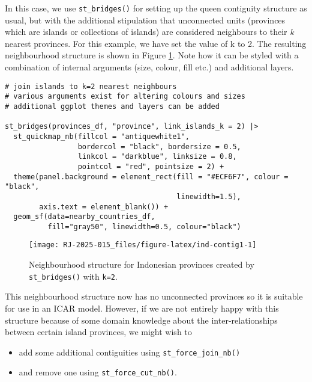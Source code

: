 In this case, we use \texttt{st\_bridges()} for setting up the queen contiguity
structure as usual, but with the additional stipulation that unconnected
units (provinces which are islands or collections of islands) are
considered neighbours to their \emph{k} nearest provinces. For this example,
we have set the value of k to 2. The resulting neighbourhood structure
is shown in Figure \ref{fig:ind-contig1}. Note how it can be styled with a combination of internal arguments (size, colour, fill etc.) and additional  layers.



\begin{verbatim}
# join islands to k=2 nearest neighbours
# various arguments exist for altering colours and sizes
# additional ggplot themes and layers can be added

st_bridges(provinces_df, "province", link_islands_k = 2) |>
  st_quickmap_nb(fillcol = "antiquewhite1",
                 bordercol = "black", bordersize = 0.5,
                 linkcol = "darkblue", linksize = 0.8,
                 pointcol = "red", pointsize = 2) +
  theme(panel.background = element_rect(fill = "#ECF6F7", colour = "black",
                                        linewidth=1.5),
        axis.text = element_blank()) +
  geom_sf(data=nearby_countries_df,
          fill="gray50", linewidth=0.5, colour="black")
\end{verbatim}

\begin{figure}

{\centering \texttt{[image: RJ-2025-015\_files/figure-latex/ind-contig1-1]} 

}

\caption{Neighbourhood structure for Indonesian provinces created by \texttt{st\_bridges()} with \texttt{k=2}.}\label{fig:ind-contig1}
\end{figure}

This neighbourhood structure now has no unconnected provinces so it is
suitable for use in an ICAR model. However, if we are not entirely happy with this structure because of some domain knowledge about the inter-relationships between certain island provinces, we might wish to

\begin{itemize}
\item
  add some additional contiguities using \texttt{st\_force\_join\_nb()}
\item
  and remove one using \texttt{st\_force\_cut\_nb()}.
\end{itemize}

